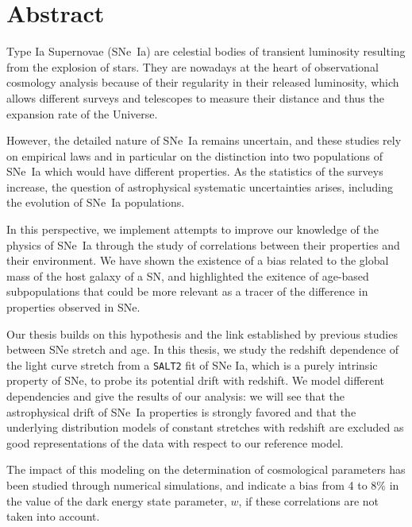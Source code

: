 \documentclass[../main/main.tex]{subfiles}
\begin{document}
\chapter*{Abstract}\label{ch}
\shorthandoff{:}

Type Ia Supernovae (SNe~Ia) are celestial bodies of transient luminosity
resulting from the explosion of stars. They are nowadays at the heart of
observational cosmology analysis because of their regularity in their released
luminosity, which allows different surveys and telescopes to measure their
distance and thus the expansion rate of the Universe.

However, the detailed nature of SNe~Ia remains uncertain, and these studies rely
on empirical laws and in particular on the distinction into two populations of
SNe~Ia which would have different properties. As the statistics of the surveys
increase, the question of astrophysical systematic uncertainties arises,
including the evolution of SNe~Ia populations.

In this perspective, we implement attempts to improve our knowledge of the
physics of SNe~Ia through the study of correlations between their properties and
their environment. We have shown the existence of a bias related to the global
mass of the host galaxy of a SN, and highlighted the exitence of age-based
subpopulations that could be more relevant as a tracer of the difference in
properties observed in SNe.

Our thesis builds on this hypothesis and the link established by previous
studies between SNe stretch and age. In this thesis, we study the redshift
dependence of the light curve stretch from a \texttt{SALT2} fit of SNe Ia, which
is a purely intrinsic property of SNe, to probe its potential drift with
redshift. We model different dependencies and give the results of our analysis:
we will see that the astrophysical drift of SNe~Ia properties is strongly
favored and that the underlying distribution models of constant stretches with
redshift are excluded as good representations of the data with respect to our
reference model.

The impact of this modeling on the determination of cosmological parameters has
been studied through numerical simulations, and indicate a bias from 4 to 8\% in
the value of the dark energy state parameter, $w$, if these correlations are not
taken into account.

\shorthandon{:}
\end{document}
